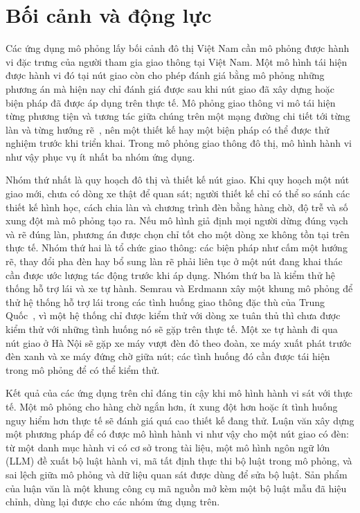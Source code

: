 \documentclass[../main.tex]{subfiles}
\begin{document}
\section{Bối cảnh và động lực}
\label{section:1.1}

Các ứng dụng mô phỏng lấy bối cảnh đô thị Việt Nam cần mô phỏng được hành vi đặc trưng của người tham gia giao thông tại Việt Nam. Một mô hình tái hiện được hành vi đó tại nút giao còn cho phép đánh giá bằng mô phỏng những phương án mà hiện nay chỉ đánh giá được sau khi nút giao đã xây dựng hoặc biện pháp đã được áp dụng trên thực tế. Mô phỏng giao thông vi mô tái hiện từng phương tiện và tương tác giữa chúng trên một mạng đường chi tiết tới từng làn và từng hướng rẽ~\cite{lopez2018sumo}, nên một thiết kế hay một biện pháp có thể được thử nghiệm trước khi triển khai. Trong mô phỏng giao thông đô thị, mô hình hành vi như vậy phục vụ ít nhất ba nhóm ứng dụng.

Nhóm thứ nhất là quy hoạch đô thị và thiết kế nút giao. Khi quy hoạch một nút giao mới, chưa có dòng xe thật để quan sát; người thiết kế chỉ có thể so sánh các thiết kế hình học, cách chia làn và chương trình đèn bằng hàng chờ, độ trễ và số xung đột mà mô phỏng tạo ra. Nếu mô hình giả định mọi người dừng đúng vạch và rẽ đúng làn, phương án được chọn chỉ tốt cho một dòng xe không tồn tại trên thực tế. Nhóm thứ hai là tổ chức giao thông: các biện pháp như cấm một hướng rẽ, thay đổi pha đèn hay bổ sung làn rẽ phải liên tục ở một nút đang khai thác cần được ước lượng tác động trước khi áp dụng. Nhóm thứ ba là kiểm thử hệ thống hỗ trợ lái và xe tự hành. Semrau và Erdmann xây một khung mô phỏng để thử hệ thống hỗ trợ lái trong các tình huống giao thông đặc thù của Trung Quốc~\cite{semrau2016chinese}, vì một hệ thống chỉ được kiểm thử với dòng xe tuân thủ thì chưa được kiểm thử với những tình huống nó sẽ gặp trên thực tế. Một xe tự hành đi qua nút giao ở Hà Nội sẽ gặp xe máy vượt đèn đỏ theo đoàn, xe máy xuất phát trước đèn xanh và xe máy đứng chờ giữa nút; các tình huống đó cần được tái hiện trong mô phỏng để có thể kiểm thử.

Kết quả của các ứng dụng trên chỉ đáng tin cậy khi mô hình hành vi sát với thực tế. Một mô phỏng cho hàng chờ ngắn hơn, ít xung đột hơn hoặc ít tình huống nguy hiểm hơn thực tế sẽ đánh giá quá cao thiết kế đang thử. Luận văn xây dựng một phương pháp để có được mô hình hành vi như vậy cho một nút giao có đèn: từ một danh mục hành vi có cơ sở trong tài liệu, một mô hình ngôn ngữ lớn (LLM) đề xuất bộ luật hành vi, mã tất định thực thi bộ luật trong mô phỏng, và sai lệch giữa mô phỏng và dữ liệu quan sát được dùng để sửa bộ luật. Sản phẩm của luận văn là một khung công cụ mã nguồn mở kèm một bộ luật mẫu đã hiệu chỉnh, dùng lại được cho các nhóm ứng dụng trên.
\end{document}
